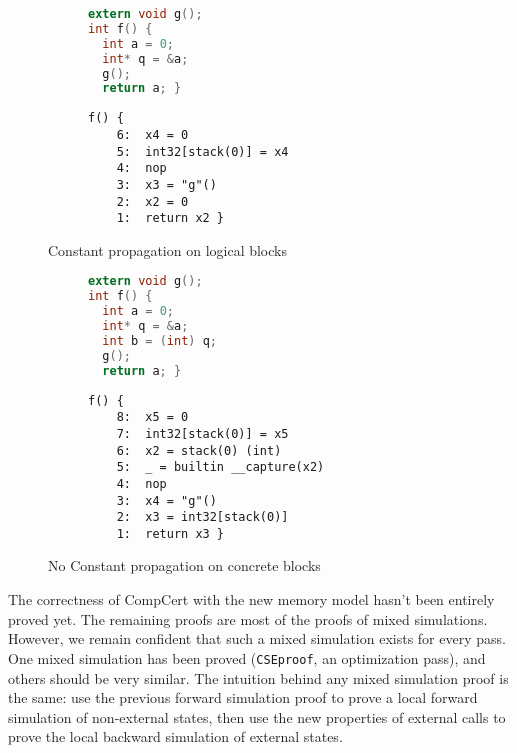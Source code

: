 \label{sec:eval}
\begin{figure}[H]
\begin{subfigure}{.48\textwidth}
  \begin{lstlisting}[language=C,basicstyle=\small]
extern void g();
int f() {
  int a = 0;
  int* q = &a;
  g();
  return a; }
\end{lstlisting}
\end{subfigure}
\begin{subfigure}{.48\textwidth}
  \begin{lstlisting}[basicstyle=\small]
f() {
    6:	x4 = 0
    5:	int32[stack(0)] = x4
    4:	nop
    3:	x3 = "g"()
    2:	x2 = 0
    1:	return x2 }
\end{lstlisting}
\end{subfigure}
\caption{Constant propagation on logical blocks}
\label{fig:cplogical}
\end{figure}
\begin{figure}[H]
\begin{subfigure}{.48\textwidth}
  \begin{lstlisting}[language=C,basicstyle=\small]
extern void g();
int f() {
  int a = 0;
  int* q = &a;
  int b = (int) q;
  g();
  return a; }
\end{lstlisting}
\end{subfigure}
\begin{subfigure}{.48\textwidth}
  \begin{lstlisting}[basicstyle=\small]
f() {
    8:	x5 = 0
    7:	int32[stack(0)] = x5
    6:	x2 = stack(0) (int)
    5:	_ = builtin __capture(x2)
    4:	nop
    3:	x4 = "g"()
    2:	x3 = int32[stack(0)]
    1:	return x3 }
\end{lstlisting}
\end{subfigure}
\caption{No Constant propagation on concrete blocks}
\label{fig:cpconcrete}
\end{figure}

The correctness of CompCert with the new memory model hasn't been entirely proved yet.
The remaining proofs are most of the proofs of mixed simulations.
However, we remain confident that such a mixed simulation exists for every pass. One mixed simulation has been proved (\texttt{CSEproof}, an optimization pass), and others should be very similar. The intuition behind any mixed simulation proof is the same: use the previous forward simulation proof to prove a local forward simulation of non-external states, then use the new properties of external calls to prove the local backward simulation of external states.


